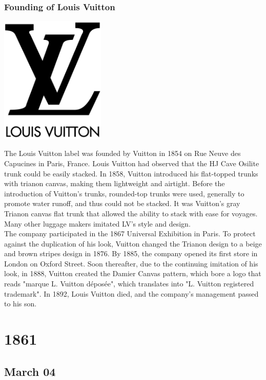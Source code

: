 \documentclass[11pt]{report}
\begin{document}
\subsection{Founding of Louis Vuitton}
\vspace{2mm}\begin{center}\includegraphics[width=5cm]{./img/LouisVuittonLogo.jpg}\end{center}
The Louis Vuitton label was founded by Vuitton in 1854 on Rue Neuve des Capucines in Paris, France. Louis Vuitton had observed that the HJ Cave Osilite trunk could be easily stacked. In 1858, Vuitton introduced his flat-topped trunks with trianon canvas, making them lightweight and airtight. Before the introduction of Vuitton's trunks, rounded-top trunks were used, generally to promote water runoff, and thus could not be stacked. It was Vuitton's gray Trianon canvas flat trunk that allowed the ability to stack with ease for voyages. Many other luggage makers imitated LV's style and design.\\
The company participated in the 1867 Universal Exhibition in Paris. To protect against the duplication of his look, Vuitton changed the Trianon design to a beige and brown stripes design in 1876. By 1885, the company opened its first store in London on Oxford Street. Soon thereafter, due to the continuing imitation of his look, in 1888, Vuitton created the Damier Canvas pattern, which bore a logo that reads "marque L. Vuitton déposée", which translates into "L. Vuitton registered trademark". In 1892, Louis Vuitton died, and the company's management passed to his son.

\chapter{1861}
\section{March 04}
\end{document}
